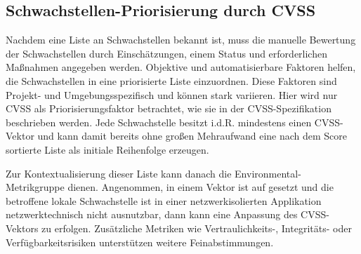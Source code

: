 \subsection{Schwachstellen-Priorisierung durch CVSS} \label{subsec:projektbericht-grundlagen-vulnerability-assessment}

Nachdem eine Liste an Schwachstellen bekannt ist, muss die manuelle Bewertung der Schwachstellen durch Einschätzungen, einem Status und erforderlichen Maßnahmen angegeben werden.
Objektive und automatisierbare Faktoren helfen, die Schwachstellen in eine priorisierte Liste einzuordnen.
Diese Faktoren sind Projekt- und Umgebungsspezifisch und können stark variieren.
Hier wird nur CVSS als Priorisierungsfaktor betrachtet, wie sie in der CVSS-Spezifikation beschrieben werden.
Jede Schwachstelle besitzt i.d.R. mindestens einen CVSS-Vektor und kann damit bereits ohne großen Mehraufwand eine nach dem Score sortierte Liste als initiale Reihenfolge erzeugen.

Zur Kontextualisierung dieser Liste kann danach die Environmental-Metrikgruppe dienen.
Angenommen, in einem Vektor ist  auf  gesetzt und die betroffene lokale Schwachstelle ist in einer netzwerkisolierten Applikation netzwerktechnisch nicht ausnutzbar, dann kann eine Anpassung des CVSS-Vektors zu  erfolgen.
Zusätzliche Metriken wie Vertraulichkeits-, Integritäts- oder Verfügbarkeitsrisiken unterstützen weitere Feinabstimmungen.

